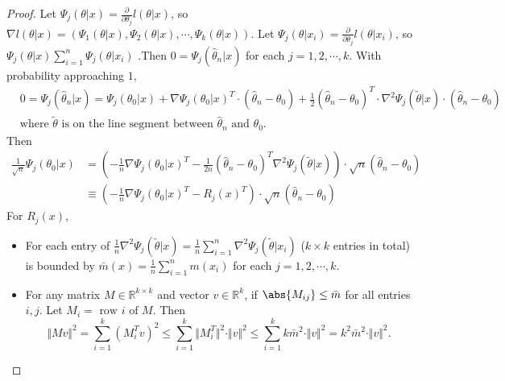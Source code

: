 \documentclass[a4paper]{article}
\begin{document}
\begin{proof}
	Let $\Psi_j(\theta|x) = \frac{\partial}{\partial \theta_j}l(\theta|x)$, so $\nabla l(\theta|x) = (\Psi_1(\theta|x),\Psi_2(\theta|x),\cdots,\Psi_k(\theta|x))$. Let $\Psi_j(\theta|x_i) = \frac{\partial}{\partial \theta_j}l(\theta|x_i)$, so $\Psi_j(\theta|x) \sum\limits_{i=1}^n \Psi_j(\theta|x_i)$ .Then $0 = \Psi_j(\hat{\theta}_n |x)$ for each $j = 1,2,\cdots,k$. With probability approaching $1$,
	\begin{equation*}
		\begin{aligned}
			& 0 = \Psi_j(\hat{\theta}_n |x) = \Psi_j(\theta_0 |x) + \nabla \Psi_j(\theta_0 |x)^T \cdot (\hat{\theta}_n - \theta_0) + \frac{1}{2} (\hat{\theta}_n - \theta_0)^T \cdot \nabla^2 \Psi_j(\tilde{\theta} |x) \cdot (\hat{\theta}_n - \theta_0) \\
			&\text{where } \tilde{\theta} \text{ is on the line segment between } \hat{\theta}_n \text{ and } \theta_0.
		\end{aligned}
	\end{equation*}
	Then
	\begin{equation}
		\begin{aligned}
			\frac{1}{\sqrt{n}} \Psi_j(\theta_0|x) & = \left(-\frac{1}{n} \nabla \Psi_j (\theta_0|x)^T - \frac{1}{2n} (\hat{\theta}_n - \theta_0)^T \nabla^2 \Psi_j(\tilde{\theta}|x)\right) \cdot \sqrt{n}(\hat{\theta}_n - \theta_0) \\
			&\equiv \left(-\frac{1}{n} \nabla \Psi_j (\theta_0|x)^T - R_j(x)^T \right) \cdot \sqrt{n}(\hat{\theta}_n - \theta_0)
		\end{aligned}
	\end{equation}
	For $R_j(x)$, 
	\begin{itemize}
		\item For each entry of $\frac{1}{n} \nabla^2 \Psi_j(\tilde{\theta}|x) = \frac{1}{n} \sum\limits_{i=1}^n \nabla^2 \Psi_j(\tilde{\theta}|x_i)$ ($k \times k$ entries in total) is bounded by $\bar{m}(x) = \frac{1}{n} \sum\limits_{i=1}^n m(x_i)$ for each $j = 1,2,\cdots,k$.
		\item For any matrix $M \in \mathbb{R}^{k \times k}$ and vector $v \in \mathbb{R}^k$, if $\abs{M_{ij}} \leq \bar{m}$ for all entries $i,j$. Let $M_i = \text{ row } i \text{ of } M$. Then
		\begin{equation*}
			\Vert Mv \Vert ^2 = \sum\limits_{i=1}^k (M_i^T v)^2 \leq \sum\limits_{i=1}^k \Vert M_i^T \Vert^2 \cdot \Vert v \Vert ^2 \leq \sum\limits_{i=1}^k k \bar{m}^2 \cdot \Vert v \Vert^2 = k^2 \bar{m}^2 \cdot \Vert v \Vert^2.
		\end{equation*}

\end{itemize}
\end{proof}
\end{document}
